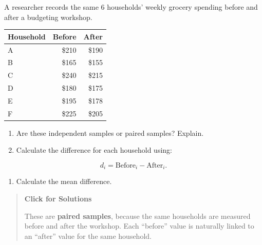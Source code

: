 \documentclass[
  letterpaper,
  DIV=11,
  numbers=noendperiod]{scrreprt}
\providecommand{\tightlist}{%
  \setlength{\itemsep}{0pt}\setlength{\parskip}{0pt}}
\begin{document}
\begin{tcolorbox}[enhanced jigsaw, arc=.35mm, bottomrule=.15mm, bottomtitle=1mm, breakable, colback=white, colbacktitle=quarto-callout-note-color!10!white, colframe=quarto-callout-note-color-frame, coltitle=black, left=2mm, leftrule=.75mm, opacityback=0, opacitybacktitle=0.6, rightrule=.15mm, title=\textcolor{quarto-callout-note-color}{\faInfo}\hspace{0.5em}{Question 8}, titlerule=0mm, toprule=.15mm, toptitle=1mm]

A researcher records the same 6 households' weekly grocery spending
before and after a budgeting workshop.

\begin{table}
\fontsize{12.0pt}{14.0pt}\selectfont
\begin{tabular*}{\linewidth}{@{\extracolsep{\fill}}lrr}
\toprule
Household & Before & After \\ 
\midrule\addlinespace[2.5pt]
A & \$210 & \$190 \\ 
B & \$165 & \$155 \\ 
C & \$240 & \$215 \\ 
D & \$180 & \$175 \\ 
E & \$195 & \$178 \\ 
F & \$225 & \$205 \\ 
\bottomrule
\end{tabular*}
\end{table}

\begin{enumerate}
\def\labelenumi{\arabic{enumi}.}
\tightlist
\item
  Are these independent samples or paired samples? Explain.
\item
  Calculate the difference for each household using:
\end{enumerate}

\[
d_i = \text{Before}_i - \text{After}_i.
\]

\begin{enumerate}
\def\labelenumi{\arabic{enumi}.}
\setcounter{enumi}{2}
\tightlist
\item
  Calculate the mean difference.
\end{enumerate}

\begin{quote}
\textbf{Click for Solutions}

These are \textbf{paired samples}, because the same households are
measured before and after the workshop. Each ``before'' value is
naturally linked to an ``after'' value for the same household.


\end{quote}
\end{tcolorbox}
\end{document}

